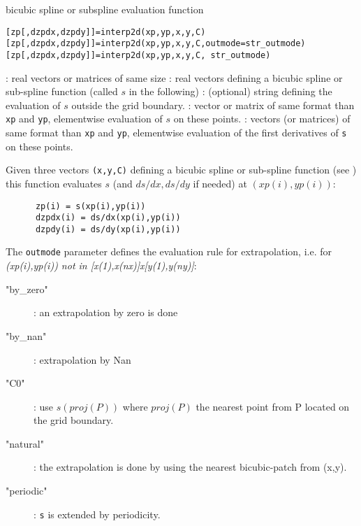 

\begin{mandesc}
 {bicubic spline or subspline evaluation function}
\end{mandesc}

\begin{calling_sequence}
\begin{verbatim}
[zp[,dzpdx,dzpdy]]=interp2d(xp,yp,x,y,C)
[zp[,dzpdx,dzpdy]]=interp2d(xp,yp,x,y,C,outmode=str_outmode)
[zp[,dzpdx,dzpdy]]=interp2d(xp,yp,x,y,C, str_outmode)
\end{verbatim}
\end{calling_sequence}


\begin{parameters}
  \begin{varlist}
   : real vectors or matrices of same size
   : real vectors defining a bicubic spline or sub-spline function 
                (called $s$ in the following)
   : (optional) string defining the evaluation of $s$ outside 
                the grid boundary.
   : vector or matrix of same format than \verb!xp! and \verb!yp!, elementwise 
                evaluation of $s$ on these points.
   : vectors (or matrices) of same format than \verb!xp! and \verb!yp!, elementwise
                evaluation of the first derivatives of \verb!s! on these points.
  \end{varlist}
\end{parameters}

\begin{mandescription}
  Given three vectors \verb!(x,y,C)! defining a bicubic spline or sub-spline function
  (see  ) this function evaluates $s$ 
  (and $ds/dx, ds/dy$ if needed) at $(xp(i),yp(i))$:
    \begin{verbatim}
      zp(i) = s(xp(i),yp(i))   
      dzpdx(i) = ds/dx(xp(i),yp(i))
      dzpdy(i) = ds/dy(xp(i),yp(i))  
    \end{verbatim}

  The \verb!outmode! parameter defines the evaluation rule for extrapolation,
  i.e. for {\em (xp(i),yp(i)) not in [x(1),x(nx)]x[y(1),y(ny)]}: 
  \begin{description}
  \item["by\_zero"]: an extrapolation by zero is done
  \item["by\_nan"]: extrapolation by Nan
  \item["C0"]:  use $s(proj(P))$ where $proj(P)$ the nearest point from P located on the grid boundary.
  \item["natural"]: the extrapolation is done by using the nearest bicubic-patch from (x,y).
  \item["periodic"]: \verb!s! is extended by periodicity. 
  \end{description}

\end{mandescription}

